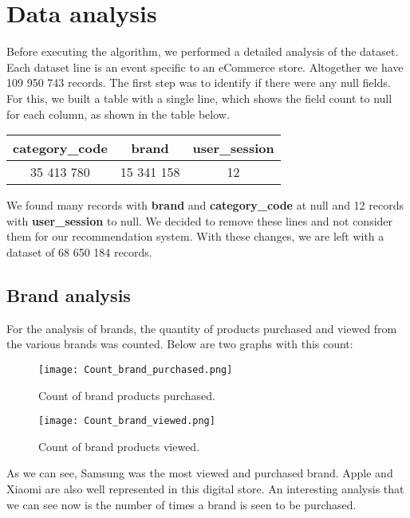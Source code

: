\section{Data analysis}
\label{data-analysis}

Before executing the algorithm, we performed a detailed analysis of the dataset.
Each dataset line is an event specific to an eCommerce store.
Altogether we have 109 950 743 records.
The first step was to identify if there were any null fields.
For this, we built a table with a single line, which shows the field count to null for each column, as shown in the table below.
\begin{center}
    \begin{tabular}{ | c | c | c | } 
        \hline
        \textbf{category\_code} & \textbf{brand} & \textbf{user\_session} \\ 
        \hline
        35 413 780 & 15 341 158 & 12 \\
        \hline
    \end{tabular}
\end{center}
We found many records with \textbf{brand} and \textbf{category\_code} at null and 12 records with \textbf{user\_session} to null.
We decided to remove these lines and not consider them for our recommendation system.
With these changes, we are left with a dataset of 68 650 184 records.

\subsection{Brand analysis}
For the analysis of brands, the quantity of products purchased and viewed from the various brands was counted.
Below are two graphs with this count:

\begin{figure}[H]
    \noindent\texttt{[image: Count\_brand\_purchased.png]}
    \caption{Count of brand products purchased.}
\end{figure}

\begin{figure}[H]
    \texttt{[image: Count\_brand\_viewed.png]}
    \caption{Count of brand products viewed.}
\end{figure}

As we can see, Samsung was the most viewed and purchased brand.
Apple and Xiaomi are also well represented in this digital store.
An interesting analysis that we can see now is the number of times a brand is seen to be purchased.

